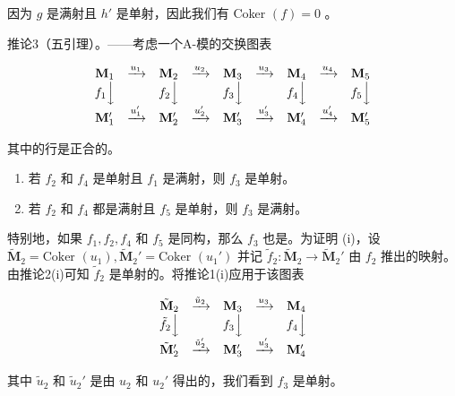 因为 \(g\) 是满射且 \(h'\) 是单射，因此我们有 Coker \((f) = 0\) 。

推论3（五引理）。——考虑一个A-模的交换图表

\[
\begin{array}{c c c c c c c c c} \mathbf {M} _ {1} & \xrightarrow {u _ {1}} & \mathbf {M} _ {2} & \xrightarrow {u _ {2}} & \mathbf {M} _ {3} & \xrightarrow {u _ {3}} & \mathbf {M} _ {4} & \xrightarrow {u _ {4}} & \mathbf {M} _ {5} \\ f _ {1} \Big \downarrow & & f _ {2} \Big \downarrow & & f _ {3} \Big \downarrow & & f _ {4} \Big \downarrow & & f _ {5} \Big \downarrow \\ \mathbf {M} _ {1} ^ {\prime} & \xrightarrow {u _ {1} ^ {\prime}} & \mathbf {M} _ {2} ^ {\prime} & \xrightarrow {u _ {2} ^ {\prime}} & \mathbf {M} _ {3} ^ {\prime} & \xrightarrow {u _ {3} ^ {\prime}} & \mathbf {M} _ {4} ^ {\prime} & \xrightarrow {u _ {4} ^ {\prime}} & \mathbf {M} _ {5} ^ {\prime} \end{array}
\]

其中的行是正合的。

\begin{enumerate}
\def\labelenumi{(\roman{enumi})}
\item
  若 \(f_{2}\) 和 \(f_{4}\) 是单射且 \(f_{1}\) 是满射，则 \(f_{3}\) 是单射。
\item
  若 \(f_{2}\) 和 \(f_{4}\) 都是满射且 \(f_{5}\) 是单射，则 \(f_{3}\) 是满射。
\end{enumerate}

特别地，如果 \(f_1, f_2, f_4\) 和 \(f_5\) 是同构，那么 \(f_3\) 也是。为证明 (i)，设 \(\tilde{\mathbf{M}}_2 = \text{Coker } (u_1), \tilde{\mathbf{M}}_2' = \text{Coker } (u_1')\) 并记 \(\tilde{f}_2: \tilde{\mathbf{M}}_2 \to \tilde{\mathbf{M}}_2'\) 由 \(f_2\) 推出的映射。由推论2(i)可知 \(\tilde{f}_2\) 是单射的。将推论1(i)应用于该图表

\[
\begin{array}{c c c c c} \tilde {\mathbf {M}} _ {2} & \xrightarrow {\tilde {u} _ {2}} & \mathbf {M} _ {3} & \xrightarrow {u _ {3}} & \mathbf {M} _ {4} \\ \tilde {f} _ {2} \Big \downarrow & & f _ {3} \Big \downarrow & & f _ {4} \Big \downarrow \\ \tilde {\mathbf {M}} _ {2} ^ {\prime} & \xrightarrow {\tilde {u} _ {2} ^ {\prime}} & \mathbf {M} _ {3} ^ {\prime} & \xrightarrow {u _ {3} ^ {\prime}} & \mathbf {M} _ {4} ^ {\prime} \end{array}
\]

其中 \(\tilde{u}_2\) 和 \(\tilde{u}_2'\) 是由 \(u_2\) 和 \(u_2'\) 得出的，我们看到 \(f_3\) 是单射。

